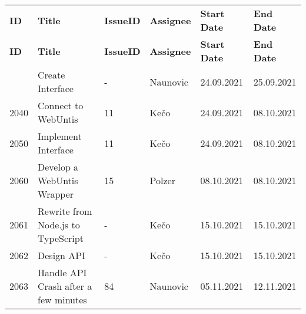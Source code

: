 \begin{longtable}{|p{}|p{}|p{}|p{}|p{}|p{}|} \hline
    \textbf{ID} & \textbf{Title} & \textbf{Issue\-ID} & \textbf{Assignee} & \textbf{Start Date} & \textbf{End\- Date} \\ \hhline{|=|=|=|=|=|=|}
    \endfirsthead
    \hline
    \textbf{ID} & \textbf{Title} & \textbf{Issue\-ID} & \textbf{Assignee} & \textbf{Start Date} & \textbf{End\- Date} \\ \hhline{|=|=|=|=|=|=|}
    \endhead
    2030 & Create Interface & - & Naunovic & 24.09.2021 & 25.09.2021 \\ \hline
    2040 & Connect to WebUntis & 11 & Kečo & 24.09.2021 & 08.10.2021 \\ \hline
    2050 & Implement Interface & 11 & Kečo & 24.09.2021 & 08.10.2021 \\ \hline
    2060 & Develop a WebUntis Wrapper & 15 & Polzer & 08.10.2021 & 08.10.2021 \\ \hline
    2061 & Rewrite from Node.js to TypeScript & - & Kečo & 15.10.2021 & 15.10.2021 \\ \hline
    2062 & Design API & - & Kečo & 15.10.2021 & 15.10.2021 \\ \hline
    2063 & Handle API Crash after a few minutes & 84 & Naunovic & 05.11.2021 & 12.11.2021 \\ \hline
\end{longtable}

